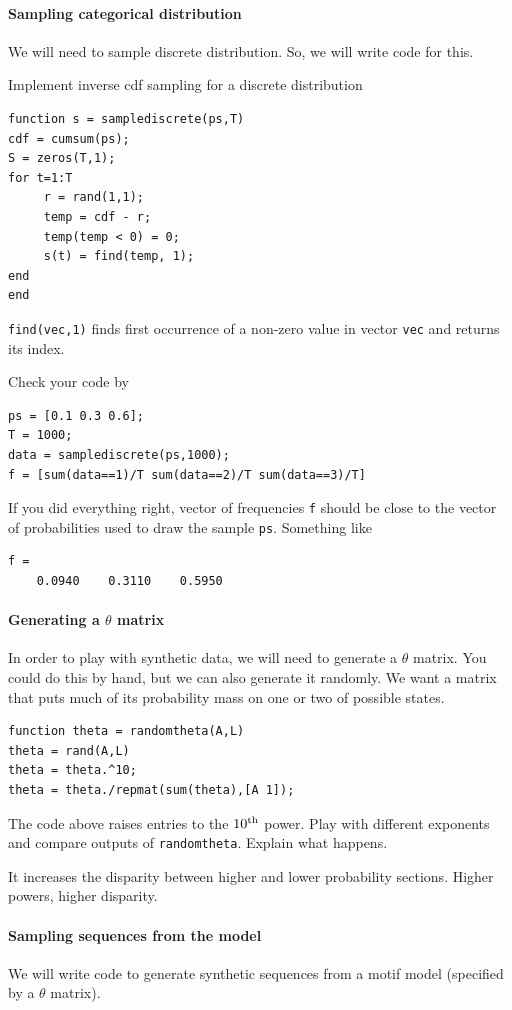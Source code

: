 \documentclass{article}
\begin{document}
{\paragraph{Sampling categorical distribution} We will need to sample discrete distribution. So, we will
write code for this.

Implement inverse cdf sampling for a discrete distribution
\begin{verbatim}
function s = samplediscrete(ps,T)
cdf = cumsum(ps);
S = zeros(T,1);
for t=1:T
     r = rand(1,1);
     temp = cdf - r;
     temp(temp < 0) = 0;
     s(t) = find(temp, 1);
end
end
\end{verbatim}

\verb|find(vec,1)| finds first occurrence of a non-zero value in vector \verb|vec| and returns its index.


Check your code by 
\begin{verbatim}
ps = [0.1 0.3 0.6];
T = 1000;
data = samplediscrete(ps,1000);
f = [sum(data==1)/T sum(data==2)/T sum(data==3)/T]
\end{verbatim}
If you did everything right, vector of frequencies \verb|f| should be close to the vector of probabilities used
to draw the sample \verb|ps|. Something like
\begin{verbatim}
f =
    0.0940    0.3110    0.5950
\end{verbatim}

\paragraph{Generating a $\theta$ matrix} In order to play with synthetic data, we will need
to generate a $\theta$ matrix. You could do this by hand, but we can also generate it randomly.
We want a matrix that puts much of its probability mass on one or two of possible states. 

\begin{verbatim}
function theta = randomtheta(A,L)
theta = rand(A,L)
theta = theta.^10;
theta = theta./repmat(sum(theta),[A 1]);
\end{verbatim}

The code above raises entries to the $10^{{\textrm{th}}}$ power.
Play with different exponents and compare outputs of \verb|randomtheta|.
Explain what happens.

It increases the disparity between higher and lower probability sections.  Higher powers, higher disparity.

\paragraph{Sampling sequences from the model}
We will write code to generate synthetic sequences from a motif model (specified by a $\theta$ matrix).

}
\end{document}
